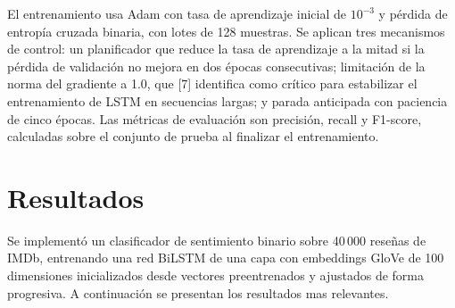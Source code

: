 \documentclass[letterpaper, 10pt, conference]{ieeeconf}
\begin{document}
\begin{table}[h]
\centering
\caption{Capas del modelo \textit{SentimentBiLSTM}.}
\label{tab:arquitectura}
\end{table}

El entrenamiento usa Adam con tasa de aprendizaje inicial de $10^{-3}$ y
p\'erdida de entrop\'ia cruzada binaria, con lotes de 128 muestras. Se
aplican tres mecanismos de control: un planificador que reduce la tasa de
aprendizaje a la mitad si la p\'erdida de validaci\'on no mejora en dos
\'epocas consecutivas; limitaci\'on de la norma del gradiente a 1.0, que [7]
identifica como cr\'itico para estabilizar el entrenamiento de LSTM en
secuencias largas; y parada anticipada con paciencia de cinco \'epocas. Las
m\'etricas de evaluaci\'on son precisi\'on, recall y F1-score, calculadas
sobre el conjunto de prueba al finalizar el entrenamiento.

\section{Resultados}

Se implement\'o un clasificador de sentimiento binario sobre 40\,000 rese\~nas
de IMDb, entrenando una red BiLSTM de una capa con embeddings GloVe de 100
dimensiones inicializados desde vectores preentrenados y ajustados de forma
progresiva. A continuaci\'on se presentan los resultados mas relevantes.
\end{document}
